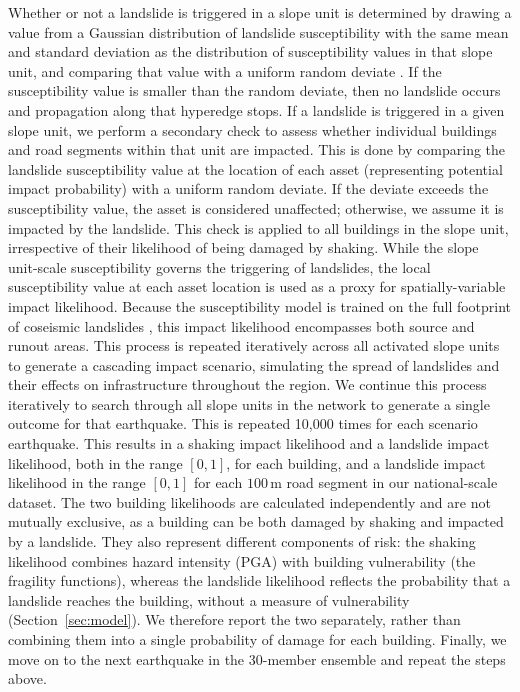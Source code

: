 \documentclass[preprint,12pt,authoryear]{elsarticle}
\begin{document}
Whether or not a landslide is triggered in a slope unit is determined by drawing a value from a Gaussian distribution of landslide susceptibility with the same mean and standard deviation as the distribution of susceptibility values in that slope unit, and comparing that value with a uniform random deviate \citep{Dunant2025}. If the susceptibility value is smaller than the random deviate, then no landslide occurs and propagation along that hyperedge stops. If a landslide is triggered in a given slope unit, we perform a secondary check to assess whether individual buildings and road segments within that unit are impacted. This is done by comparing the landslide susceptibility value at the location of each asset (representing potential impact probability) with a uniform random deviate. If the deviate exceeds the susceptibility value, the asset is considered unaffected; otherwise, we assume it is impacted by the landslide. This check is applied to all buildings in the slope unit, irrespective of their likelihood of being damaged by shaking. While the slope unit-scale susceptibility governs the triggering of landslides, the local susceptibility value at each asset location is used as a proxy for spatially-variable impact likelihood. Because the susceptibility model is trained on the full footprint of coseismic landslides \citep{Kincey2021}, this impact likelihood encompasses both source and runout areas. This process is repeated iteratively across all activated slope units to generate a cascading impact scenario, simulating the spread of landslides and their effects on infrastructure throughout the region. We continue this process iteratively to search through all slope units in the network to generate a single outcome for that earthquake. This is repeated 10,000 times for each scenario earthquake. This results in a shaking impact likelihood and a landslide impact likelihood, both in the range $[0,1]$, for each building, and a landslide impact likelihood in the range $[0,1]$ for each $100\,\text{m}$ road segment in our national-scale dataset. The two building likelihoods are calculated independently and are not mutually exclusive, as a building can be both damaged by shaking and impacted by a landslide. They also represent different components of risk: the shaking likelihood combines hazard intensity (PGA) with building vulnerability (the fragility functions), whereas the landslide likelihood reflects the probability that a landslide reaches the building, without a measure of vulnerability (Section~\ref{sec:model}). We therefore report the two separately, rather than combining them into a single probability of damage for each building. Finally, we move on to the next earthquake in the 30-member ensemble and repeat the steps above.
\end{document}
